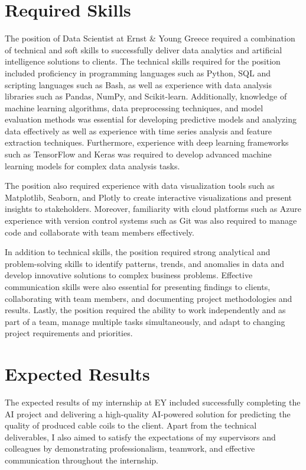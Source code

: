 \section{Required Skills}

The position of Data Scientist at Ernst \& Young Greece required a combination
of technical and soft skills to successfully deliver data analytics and
artificial intelligence solutions to clients. The technical skills required for
the position included proficiency in programming languages such as Python, SQL
and scripting languages such as Bash, as well as experience with data analysis
libraries such as Pandas, NumPy, and Scikit-learn. Additionally, knowledge of
machine learning algorithms, data preprocessing techniques, and model
evaluation methods was essential for developing predictive models and analyzing
data effectively as well as experience with time series analysis and feature
extraction techniques. Furthermore, experience with deep learning frameworks
such as TensorFlow and Keras was required to develop advanced machine learning
models for complex data analysis tasks.

The position also required experience with data visualization tools such as
Matplotlib, Seaborn, and Plotly to create interactive visualizations and
present insights to stakeholders. Moreover, familiarity with cloud platforms
such as Azure experience with version control systems such as Git was also
required to manage code and collaborate with team members effectively.

In addition to technical skills, the position required strong analytical and
problem-solving skills to identify patterns, trends, and anomalies in data and
develop innovative solutions to complex business problems. Effective
communication skills were also essential for presenting findings to clients,
collaborating with team members, and documenting project methodologies and
results. Lastly, the position required the ability to work independently and as
part of a team, manage multiple tasks simultaneously, and adapt to changing
project requirements and priorities.

\section{Expected Results}

The expected results of my internship at EY included successfully completing
the AI project and delivering a high-quality AI-powered solution for
predicting the quality of produced cable coils to the client. Apart from the
technical deliverables, I also aimed to satisfy the expectations of my
supervisors and colleagues by demonstrating professionalism, teamwork, and
effective communication throughout the internship.